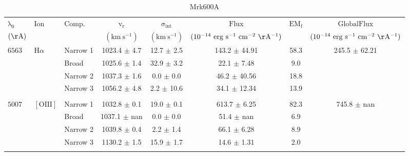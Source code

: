 \documentclass{article}
\begin{document}
\begin{table}[tbp]
\centering
\begin{tabular}{lllccccc}
\hline
$\mathrm{\lambda_0}$ & $\mathrm{Ion}$ & $\mathrm{Comp.}$ & $\mathrm{v_r}$ & $\mathrm{\sigma_{int}}$ & $\mathrm{Flux}$ & $\mathrm{EM_f}$ & $\mathrm{GlobalFlux}$ \\ 
$(\mathrm{\AA})$ &  &  & $(\mathrm{km \ s^{-1}})$ & $(\mathrm{km \ s^{-1}})$ & $(\mathrm{10^{-14} \ erg \ s^{-1} \ cm^{-2} \ \AA^{-1}})$ &  & $(\mathrm{10^{-14} \ erg \ s^{-1} \ cm^{-2} \ \AA^{-1}})$ \\ 
\hline
$6563$ & $\mathrm{H}\alpha$ & Narrow 1 & 1023.4 $\pm$ 4.7 & 12.7 $\pm$ 2.5 & 143.2 $\pm$ 44.91 & 58.3 & 245.5 $\pm$ 62.21 \\ 
 &  & Broad & 1025.6 $\pm$ 1.4 & 32.9 $\pm$ 3.2 & 22.1 $\pm$ 7.48 & 9.0 &  \\ 
 &  & Narrow 2 & 1037.3 $\pm$ 1.6 & 0.0 $\pm$ 0.0 & 46.2 $\pm$ 40.56 & 18.8 &  \\ 
 &  & Narrow 3 & 1056.2 $\pm$ 4.8 & 2.2 $\pm$ 10.6 & 34.1 $\pm$ 12.34 & 13.9 &  \\ 
 &  &  &  &  &  &  &  \\ 
$5007$ & $\mathrm{[OIII]}$ & Narrow 1 & 1032.8 $\pm$ 0.1 & 19.0 $\pm$ 0.1 & 613.7 $\pm$ 6.25 & 82.3 & 745.8 $\pm$ nan \\ 
 &  & Broad & 1037.1 $\pm$ nan & 0.0 $\pm$ 0.0 & 51.4 $\pm$ nan & 6.9 &  \\ 
 &  & Narrow 2 & 1039.8 $\pm$ 0.4 & 2.2 $\pm$ 1.4 & 66.1 $\pm$ 6.28 & 8.9 &  \\ 
 &  & Narrow 3 & 1130.2 $\pm$ 1.5 & 15.9 $\pm$ 1.7 & 14.6 $\pm$ 1.31 & 2.0 &  \\ 
 &  &  &  &  &  &  &  \\ 
\hline
\end{tabular}
\caption{Mrk600A}
\end{table}
\end{document}
